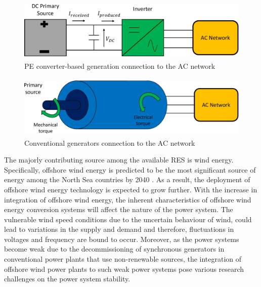 \begin{figure}[H]
\centering
    \includegraphics[height = 3cm,width = 12cm]{Diagrams/Chapter_1/Energy_conv_system_2.pdf}
    \caption{PE converter-based generation connection to the AC network \cite{denis_migrate_2018}}
    \label{fig:Energy_conv_system_2}
\end{figure}
\vspace{0mm}
\begin{figure}[H]
\centering
    \includegraphics[height = 3cm,width = 12.5cm]{Diagrams/Chapter_1/Energy_conv_system.pdf}
    \caption{Conventional generators connection to the AC network \cite{denis_migrate_2018}}
    \label{fig:Energy_conv_system}
\end{figure}

The majorly contributing source among the available \gls{RES} is wind energy. Specifically, offshore wind energy is predicted to be the most significant source of energy among the North Sea countries by 2040 \cite{muller2017translate}. As a result, the deployment of offshore wind energy technology is expected to grow further. With the increase in integration of offshore wind energy, the inherent characteristics of offshore wind energy conversion systems will affect the nature of the power system. The vulnerable wind speed conditions due to the uncertain behaviour of wind, could lead to variations in the supply and demand and therefore, fluctuations in voltages and frequency are bound to occur. Moreover, as the power systems become weak due to the decommissioning of synchronous generators in conventional power plants that use non-renewable sources, the integration of offshore wind power plants to such weak power systems pose various research challenges on the power system stability. 


